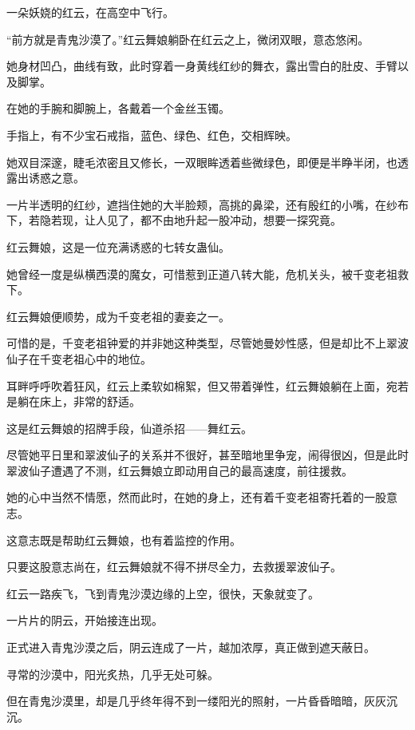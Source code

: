 
\begin{this_body}

一朵妖娆的红云，在高空中飞行。

“前方就是青鬼沙漠了。”红云舞娘躺卧在红云之上，微闭双眼，意态悠闲。

她身材凹凸，曲线有致，此时穿着一身黄线红纱的舞衣，露出雪白的肚皮、手臂以及脚掌。

在她的手腕和脚腕上，各戴着一个金丝玉镯。

手指上，有不少宝石戒指，蓝色、绿色、红色，交相辉映。

她双目深邃，睫毛浓密且又修长，一双眼眸透着些微绿色，即便是半睁半闭，也透露出诱惑之意。

一片半透明的红纱，遮挡住她的大半脸颊，高挑的鼻梁，还有殷红的小嘴，在纱布下，若隐若现，让人见了，都不由地升起一股冲动，想要一探究竟。

红云舞娘，这是一位充满诱惑的七转女蛊仙。

她曾经一度是纵横西漠的魔女，可惜惹到正道八转大能，危机关头，被千变老祖救下。

红云舞娘便顺势，成为千变老祖的妻妾之一。

可惜的是，千变老祖钟爱的并非她这种类型，尽管她曼妙性感，但是却比不上翠波仙子在千变老祖心中的地位。

耳畔呼呼吹着狂风，红云上柔软如棉絮，但又带着弹性，红云舞娘躺在上面，宛若是躺在床上，非常的舒适。

这是红云舞娘的招牌手段，仙道杀招——舞红云。

尽管她平日里和翠波仙子的关系并不很好，甚至暗地里争宠，闹得很凶，但是此时翠波仙子遭遇了不测，红云舞娘立即动用自己的最高速度，前往援救。

她的心中当然不情愿，然而此时，在她的身上，还有着千变老祖寄托着的一股意志。

这意志既是帮助红云舞娘，也有着监控的作用。

只要这股意志尚在，红云舞娘就不得不拼尽全力，去救援翠波仙子。

红云一路疾飞，飞到青鬼沙漠边缘的上空，很快，天象就变了。

一片片的阴云，开始接连出现。

正式进入青鬼沙漠之后，阴云连成了一片，越加浓厚，真正做到遮天蔽日。

寻常的沙漠中，阳光炙热，几乎无处可躲。

但在青鬼沙漠里，却是几乎终年得不到一缕阳光的照射，一片昏昏暗暗，灰灰沉沉。


\end{this_body}
